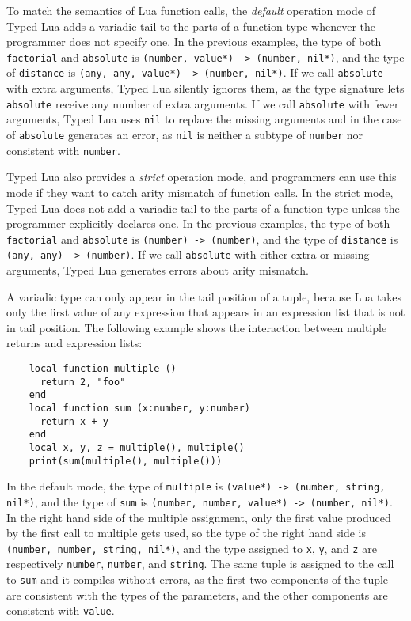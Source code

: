 To match the semantics of Lua function calls, the \emph{default} operation
mode of Typed Lua adds a variadic tail to the parts of a function
type whenever the programmer does not specify one.
In the previous examples, the type of both \texttt{factorial} and
\texttt{absolute} is \texttt{(number, value*) -> (number, nil*)},
and the type of \texttt{distance} is \texttt{(any, any, value*) -> (number, nil*)}.
If we call \texttt{absolute} with extra arguments, Typed Lua silently ignores
them, as the type signature lets \texttt{absolute} receive any number of
extra arguments.
If we call \texttt{absolute} with fewer arguments, Typed Lua uses \texttt{nil} to
replace the missing arguments and in the case of \texttt{absolute} generates
an error, as \texttt{nil} is neither a subtype of \texttt{number} nor consistent
with \texttt{number}.

Typed Lua also provides a \emph{strict} operation mode, and programmers can
use this mode if they want to catch arity mismatch of function calls.
In the strict mode, Typed Lua does not add a variadic tail to the
parts of a function type unless the programmer explicitly declares one.
In the previous examples, the type of both \texttt{factorial} and
\texttt{absolute} is \texttt{(number) -> (number)},
and the type of \texttt{distance} is \texttt{(any, any) -> (number)}.
If we call \texttt{absolute} with either extra or missing arguments,
Typed Lua generates errors about arity mismatch.

A variadic type can only appear in the tail position of a tuple,
because Lua takes only the first value of any expression that appears
in an expression list that is not in tail position.
The following example shows the interaction between multiple returns
and expression lists:
\begin{verbatim}
    local function multiple ()
      return 2, "foo"
    end
    local function sum (x:number, y:number)
      return x + y
    end
    local x, y, z = multiple(), multiple()
    print(sum(multiple(), multiple()))
\end{verbatim}

In the default mode, the type of \texttt{multiple} is
\texttt{(value*) -> (number, string, nil*)},
and the type of \texttt{sum} is \texttt{(number, number, value*) -> (number, nil*)}.
In the right hand side of the multiple assignment, only the first
value produced by the first call to multiple gets used,
so the type of the right hand side is
\texttt{(number, number, string, nil*)},
and the type assigned to \texttt{x}, \texttt{y}, and \texttt{z}
are respectively \texttt{number}, \texttt{number}, and \texttt{string}.
The same tuple is assigned to the call to \texttt{sum} and it
compiles without errors, as the first two components of the tuple
are consistent with the types of the parameters, and the other
components are consistent with \texttt{value}.

